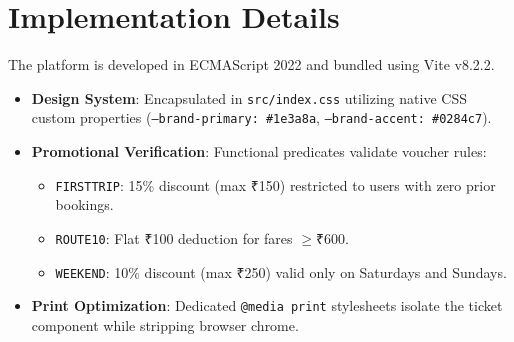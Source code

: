 \documentclass[conference]{IEEEtran}
\begin{document}
\section{Implementation Details}
The platform is developed in ECMAScript 2022 and bundled using Vite v8.2.2.
\begin{itemize}
    \item \textbf{Design System}: Encapsulated in \texttt{src/index.css} utilizing native CSS custom properties (\texttt{--brand-primary: \#1e3a8a}, \texttt{--brand-accent: \#0284c7}).
    \item \textbf{Promotional Verification}: Functional predicates validate voucher rules:
    \begin{itemize}
        \item \texttt{FIRSTTRIP}: 15\% discount (max ₹150) restricted to users with zero prior bookings.
        \item \texttt{ROUTE10}: Flat ₹100 deduction for fares $\ge ₹600$.
        \item \texttt{WEEKEND}: 10\% discount (max ₹250) valid only on Saturdays and Sundays.
    \end{itemize}
    \item \textbf{Print Optimization}: Dedicated \texttt{@media print} stylesheets isolate the ticket component while stripping browser chrome.
\end{itemize}
\end{document}

